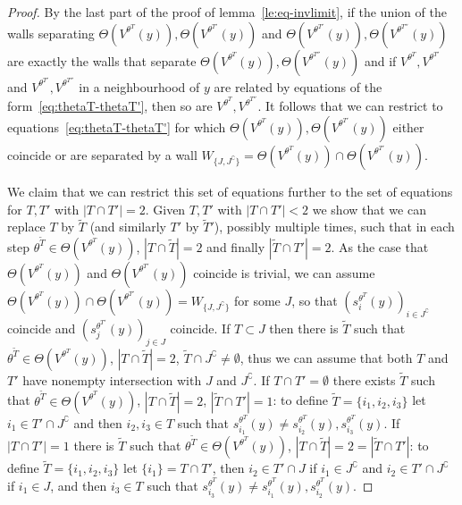 \documentclass[ALCO,ThmDefs,Unicode,epreuves]{cedram}
\begin{document}
\begin{proof}
By the last part of the proof of lemma~\ref{le:eq-invlimit}, if the union of the walls 
separating $\Theta(V^{\theta^T}\!(y)),\Theta(V^{\theta^{T'}}\!\!(y))$ and 
$\Theta(V^{\theta^{T'}}\!\!(y)),\Theta(V^{\theta^{T''}}\!\!(y))$ are exactly 
the walls that separate $\Theta(V^{\theta^T}\!(y)),\Theta(V^{\theta^{T''}}\!\!(y))$ 
and if $V^{\theta^T}\!\!,V^{\theta^{{T'}}}\!\!$ and 
$V^{\theta^{{T'}}}\!\!\!,V^{\theta^{T''}}\!\!$ in a neighbourhood of $y$ 
are related by equations of the form~\eqref{eq:thetaT-thetaT'}, 
then so are $V^{\theta^T}\!\!,V^{\theta^{T''}}\!\!\!$. 
It follows that we can restrict to equations~\eqref{eq:thetaT-thetaT'} for which 
$\Theta(V^{\theta^T}\!(y)),\Theta(V^{\theta^{T'}}\!\!(y))$ either coincide or 
are separated by a wall 
$W_{\{J,J^\complement\}}=\Theta(V^{\theta^T}\!(y))\cap \Theta(V^{\theta^{T'}}\!\!(y))$.

We claim that we can restrict this set of equations further to the set of equations 
for $T,T'$ with $|T\cap T'|=2$. 
Given $T,T'$ with $|T\cap T'|<2$ we show that we can replace $T$ by $\tilde{T}$ 
(and similarly $T'$ by $\tilde{T}'$), possibly multiple times, such that 
in each step $\theta^{\tilde{T}}\!\in \Theta(V^{\theta^T}\!(y))$, 
$|T\cap\tilde{T}|=2$ and finally $|\tilde{T}\cap T'|=2$.
As the case that $\Theta(V^{\theta^T}\!(y))$ and $\Theta(V^{\theta^{T'}}\!\!(y))$ 
coincide is trivial, we can assume 
$\Theta(V^{\theta^T}\!(y))\cap \Theta(V^{\theta^{T'}}\!\!(y))=W_{\{J,J^\complement\}}$ 
for some $J$, so that $(s^{\theta^T}_i\!(y))_{i\in J^\complement}$ coincide and
$(s^{\theta^{T'}}_j\!\!(y))_{j\in J}$ coincide.
If $T\subset J$ then there is $\tilde T$ such that 
$\theta^{\tilde T}\!\!\in \Theta(V^{\theta^T}\!(y))$, 
$|T\cap\tilde T|=2$, $\tilde T\cap J^\complement\neq\emptyset$, thus we can assume
that both $T$ and $T'$ have nonempty intersection with $J$ and $J^\complement$.
If $T\cap T'=\emptyset$ there exists $\tilde{T}$ such that 
$\theta^{\tilde{T}}\!\in \Theta(V^{\theta^T}\!(y))$, $|T\cap\tilde{T}|=2$, 
$|\tilde{T}\cap T'|=1$: to define $\tilde{T}=\{i_1,i_2,i_3\}$ let 
$i_1\in T'\cap J^\complement$ and then $i_2,i_3\in T$ such that 
$s^{\theta^T}_{i_1}\!(y)\neq s^{\theta^T}_{i_2}\!(y),s^{\theta^T}_{i_3}\!(y)$. 
If $|T\cap T'|=1$ there is $\tilde{T}$ such that $\theta^{\tilde{T}}\!\in
\Theta(V^{\theta^T}\!(y))$, $|T\cap\tilde{T}|=2=|\tilde{T}\cap T'|$: 
to define $\tilde{T}=\{i_1,i_2,i_3\}$ let $\{i_1\}=T\cap T'$, 
then $i_2\in T'\cap J$ if $i_1\in J^\complement$ and 
$i_2\in T'\cap J^\complement$ if $i_1\in J$, and then $i_3\in T$ such that 
$s^{\theta^T}_{i_3}\!(y)\neq s^{\theta^T}_{i_1}\!(y),s^{\theta^T}_{i_2}\!(y)$.


\end{proof}
\end{document}
